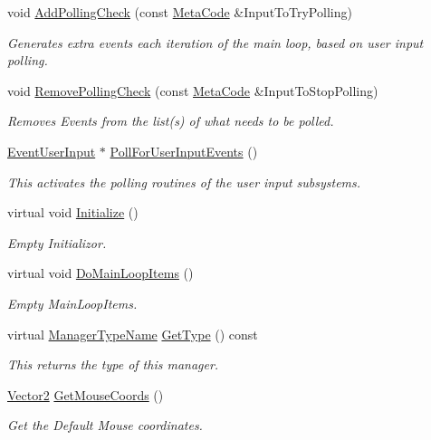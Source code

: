 \begin{DoxyCompactItemize}
void \hyperlink{classphys_1_1EventManager_a6ff66883358344908afd11204f79f196}{AddPollingCheck} (const \hyperlink{classphys_1_1MetaCode}{MetaCode} \&InputToTryPolling)
\begin{DoxyCompactList}\small\item\em Generates extra events each iteration of the main loop, based on user input polling. \item\end{DoxyCompactList}\item 
void \hyperlink{classphys_1_1EventManager_adaf7d5346932506ed43f893eb071fd39}{RemovePollingCheck} (const \hyperlink{classphys_1_1MetaCode}{MetaCode} \&InputToStopPolling)
\begin{DoxyCompactList}\small\item\em Removes Events from the list(s) of what needs to be polled. \item\end{DoxyCompactList}\item 
\hyperlink{classphys_1_1EventUserInput}{EventUserInput} $\ast$ \hyperlink{classphys_1_1EventManager_a983bc9f1933466491e6bf025b26a9023}{PollForUserInputEvents} ()
\begin{DoxyCompactList}\small\item\em This activates the polling routines of the user input subsystems. \item\end{DoxyCompactList}\item 
virtual void \hyperlink{classphys_1_1EventManager_a51afdd83f44f461dfac5c9eca5883ea0}{Initialize} ()
\begin{DoxyCompactList}\small\item\em Empty Initializor. \item\end{DoxyCompactList}\item 
virtual void \hyperlink{classphys_1_1EventManager_aca8fb3d285484dcdb943824bf11f3596}{DoMainLoopItems} ()
\begin{DoxyCompactList}\small\item\em Empty MainLoopItems. \item\end{DoxyCompactList}\item 
virtual \hyperlink{classphys_1_1ManagerBase_aaa6ccddf23892eaccb898529414f80a5}{ManagerTypeName} \hyperlink{classphys_1_1EventManager_a194890f7f8be5d45aa98623481482696}{GetType} () const 
\begin{DoxyCompactList}\small\item\em This returns the type of this manager. \item\end{DoxyCompactList}\item 
\hyperlink{classphys_1_1Vector2}{Vector2} \hyperlink{classphys_1_1EventManager_af7eb6f0fda18c5f10ab9fb79b8c9ab49}{GetMouseCoords} ()
\begin{DoxyCompactList}\small\item\em Get the Default Mouse coordinates. \item\end{DoxyCompactList}\end{DoxyCompactItemize}


